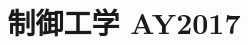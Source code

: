 \documentclass[11pt,a4paper]{article}
\title{制御工学 AY2017}
\author{}
\date{}
\begin{document}
\maketitle


\bigskip

\end{document}
